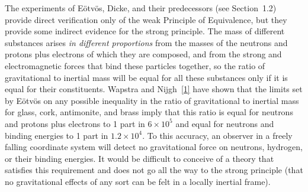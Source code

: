 The experiments of E\"otv\"os, Dicke, and their predecessors (see
Section~1.2) provide direct verification only of the weak Principle of
Equivalence, but they provide some indirect evidence for the strong
principle. The mass of different substances arises \emph{in different
proportions} from the masses of the neutrons and protons plus electrons of
which they are composed, and from the strong and electromagnetic forces that
bind these particles together, so the ratio of gravitational to inertial
mass will be equal for all these substances only if it is equal for their
constituents. Wapstra and Nijgh~\hyperref[ch3-ref-1]{[1]} have shown that the
limits set by E\"otv\"os on any possible inequality in the ratio of
gravitational to inertial mass for glass, cork, antimonite, and brass imply
that this ratio is equal for neutrons and protons plus electrons to 1 part in
$6\times10^5$ and equal for neutrons and binding energies to 1 part in
$1.2\times10^4$. To this accuracy, an observer in a freely falling
coordinate system will detect no gravitational force on neutrons, hydrogen,
or their binding energies. It would be difficult to conceive of a theory
that satisfies this requirement and does not go all the way to the strong
principle (that no gravitational effects of any sort can be felt in a
locally inertial frame).

